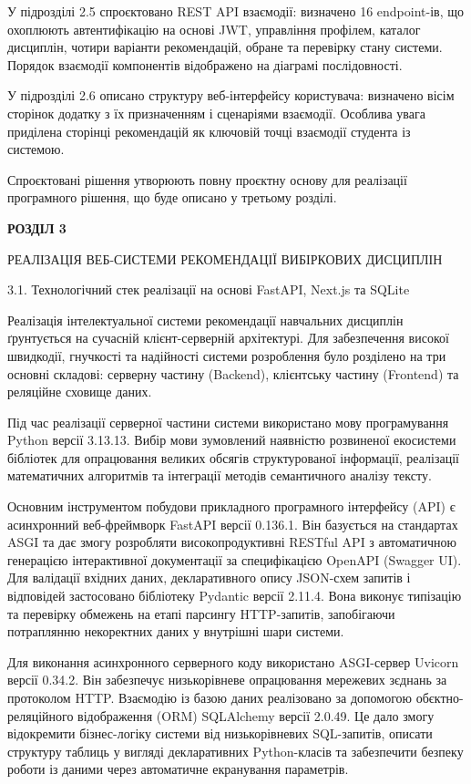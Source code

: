 \documentclass[
]{article}
\begin{document}
У підрозділі 2.5 спроєктовано REST API взаємодії: визначено 16
endpoint-ів, що охоплюють автентифікацію на основі JWT, управління
профілем, каталог дисциплін, чотири варіанти рекомендацій, обране та
перевірку стану системи. Порядок взаємодії компонентів відображено на
діаграмі послідовності.

У підрозділі 2.6 описано структуру веб-інтерфейсу користувача: визначено
вісім сторінок додатку з їх призначенням і сценаріями взаємодії.
Особлива увага приділена сторінці рекомендацій як ключовій точці
взаємодії студента із системою.

Спроєктовані рішення утворюють повну проєктну основу для реалізації
програмного рішення, що буде описано у третьому розділі.

\protect{}\label{_Toc230434094}{}\textbf{РОЗДІЛ 3}

\protect{}\label{_Toc230434095}{}РЕАЛІЗАЦІЯ ВЕБ-СИСТЕМИ
РЕКОМЕНДАЦІЇ ВИБІРКОВИХ ДИСЦИПЛІН

\protect{}\label{_Toc230434096}{}3.1. Технологічний стек
реалізації на основі FastAPI, Next.js та SQLite

Реалізація інтелектуальної системи рекомендації навчальних дисциплін
ґрунтується на сучасній клієнт-серверній архітектурі. Для забезпечення
високої швидкодії, гнучкості та надійності системи розроблення було
розділено на три основні складові: серверну частину (Backend),
клієнтську частину (Frontend) та реляційне сховище даних.

Під час реалізації серверної частини системи використано мову
програмування Python версії 3.13.13. Вибір мови зумовлений наявністю
розвиненої екосистеми бібліотек для опрацювання великих обсягів
структурованої інформації, реалізації математичних алгоритмів та
інтеграції методів семантичного аналізу тексту.

Основним інструментом побудови прикладного програмного інтерфейсу (API)
є асинхронний веб-фреймворк FastAPI версії 0.136.1. Він базується на
стандартах ASGI та дає змогу розробляти високопродуктивні RESTful API з
автоматичною генерацією інтерактивної документації за специфікацією
OpenAPI (Swagger UI). Для валідації вхідних даних, декларативного опису
JSON-схем запитів і відповідей застосовано бібліотеку Pydantic версії
2.11.4. Вона виконує типізацію та перевірку обмежень на етапі парсингу
HTTP-запитів, запобігаючи потраплянню некоректних даних у внутрішні шари
системи.

Для виконання асинхронного серверного коду використано ASGI-сервер
Uvicorn версії 0.34.2. Він забезпечує низькорівневе опрацювання
мережевих з\textquotesingle єднань за протоколом HTTP. Взаємодію із
базою даних реалізовано за допомогою
об\textquotesingle єктно-реляційного відображення (ORM) SQLAlchemy
версії 2.0.49. Це дало змогу відокремити бізнес-логіку системи від
низькорівневих SQL-запитів, описати структуру таблиць у вигляді
декларативних Python-класів та забезпечити безпеку роботи із даними
через автоматичне екранування параметрів.
\end{document}
